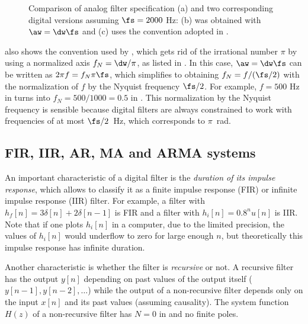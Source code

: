 \begin{figure}[htbp]
\centering
  \caption{Comparison of analog filter specification (a) and two corresponding digital versions assuming $\fs=2000$ Hz: (b) was obtained with $\aw = \dw \fs$ and (c) uses the convention adopted in {\matlab}.}
  \label{fig:specs_three}
\end{figure}

 also shows the convention used by {\matlab}, which gets rid of the irrational number $\pi$ by using a normalized axis $f_N=\dw/\pi$, as listed in . In this case, $\aw = \dw \fs$ can be written as $2 \pi f = f_N \pi \fs$, which simplifies to obtaining $f_N = f/(\fs/2)$ with the normalization of $f$ by the Nyquist frequency $\fs/2$. For example, $f=500$ Hz in  turns into $f_N = 500/1000=0.5$ in . This normalization by the Nyquist frequency is sensible because digital filters are always constrained to work with frequencies of at most $\fs/2$~Hz, which corresponds to $\pi$~rad.
\eExample 

\subsection{FIR, IIR, AR, MA and ARMA systems}
\label{sec:arma}

An important characteristic of a digital filter is the \emph{duration of its impulse response}, which allows to classify it as a finite impulse response (FIR) or infinite impulse response (IIR) filter. For example, a filter with $h_f[n]=3\delta[n]+2\delta[n-1]$ is FIR and a filter with $h_i[n]=0.8^n u[n]$ is IIR. Note that if one plots $h_i[n]$ in a computer, due to the limited precision, the values of $h_i[n]$ would underflow to zero for large enough $n$, but theoretically this impulse response has infinite duration.

Another characteristic is whether the filter is \emph{recursive} or not. A recursive filter has the output $y[n]$ depending on past values of the output itself ($y[n-1], y[n-2], \ldots$) while the output of a non-recursive filter depends only on the input $x[n]$ and its past values (assuming causality). The system function $H(z)$ of a non-recursive filter has $N=0$ in  and no finite poles.

